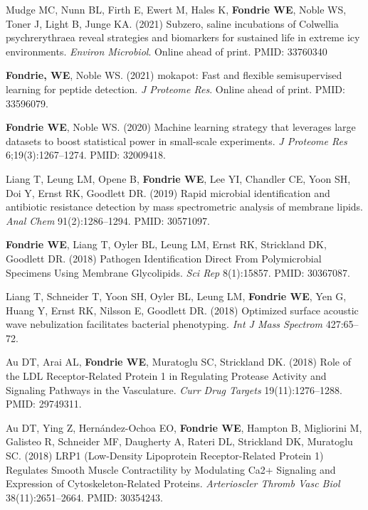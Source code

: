 \documentclass[11pt]{article}
\begin{document}
\begin{etaremune}

  \item Mudge MC, Nunn BL, Firth E, Ewert M, Hales K, \textbf{Fondrie WE},
  Noble WS, Toner J, Light B, Junge KA. (2021) Subzero, saline incubations of
  Colwellia psychrerythraea reveal strategies and biomarkers for sustained life
  in extreme icy environments. \textit{Environ Microbiol}. Online ahead of
  print. PMID: 33760340

  \item \textbf{Fondrie, WE}, Noble WS. (2021) mokapot: Fast and flexible
  semisupervised learning for peptide detection. \textit{J Proteome Res}.
  Online ahead of print. PMID: 33596079.

  \item \textbf{Fondrie WE}, Noble WS. (2020) Machine learning strategy that
  leverages large datasets to boost statistical power in small-scale
  experiments. \textit{J Proteome Res} 6;19(3):1267--1274. PMID: 32009418.
  
  \item Liang T, Leung LM, Opene B, \textbf{Fondrie WE}, Lee YI, Chandler CE,
  Yoon SH, Doi Y, Ernst RK, Goodlett DR. (2019) Rapid microbial identification
  and antibiotic resistance detection by mass spectrometric analysis of
  membrane lipids. \textit{Anal Chem} 91(2):1286--1294. PMID: 30571097.

  \item \textbf{Fondrie WE}, Liang T, Oyler BL, Leung LM, Ernst RK, Strickland
  DK, Goodlett DR. (2018) Pathogen Identification Direct From Polymicrobial
  Specimens Using Membrane Glycolipids. \textit{Sci Rep} 8(1):15857. PMID:
  30367087.
    
  \item Liang T, Schneider T, Yoon SH, Oyler BL, Leung LM, \textbf{Fondrie WE},
  Yen G, Huang Y, Ernst RK, Nilsson E, Goodlett DR. (2018) Optimized surface
  acoustic wave nebulization facilitates bacterial phenotyping. \textit{Int J
    Mass Spectrom} 427:65--72.
    
  \item Au DT, Arai AL, \textbf{Fondrie WE}, Muratoglu SC, Strickland DK.
  (2018) Role of the LDL Receptor-Related Protein 1 in Regulating Protease
  Activity and Signaling Pathways in the Vasculature. \textit{Curr Drug
    Targets} 19(11):1276--1288. PMID: 29749311.

  \item Au DT, Ying Z, Hernández-Ochoa EO, \textbf{Fondrie WE}, Hampton B,
  Migliorini M, Galisteo R, Schneider MF, Daugherty A, Rateri DL, Strickland
  DK, Muratoglu SC. (2018) LRP1 (Low-Density Lipoprotein Receptor-Related
  Protein 1) Regulates Smooth Muscle Contractility by Modulating Ca2+ Signaling
  and Expression of Cytoskeleton-Related Proteins. \textit{Arterioscler Thromb
    Vasc Biol} 38(11):2651--2664. PMID: 30354243.
    

\end{etaremune}
\end{document}
